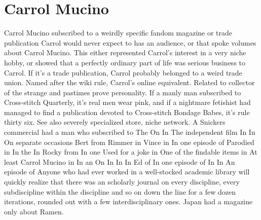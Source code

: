 \documentclass[12pt]{book}
\begin{document}
\chapter{Carrol Mucino}

Carrol Mucino subscribed to a weirdly specific fandom magazine or trade publication Carrol would never expect to has an audience, or that spoke volumes about Carrol Mucino. This either represented Carrol's interest in a very niche hobby, or showed that a perfectly ordinary part of life was serious business to Carrol. If it's a trade publication, Carrol probably belonged to a weird trade union. Named after the wiki rule, Carrol's online equivalent. Related to collector of the strange and pastimes prove personality. If a manly man subscribed to Cross-stitch Quarterly, it's real men wear pink, and if a nightmare fetishist had managed to find a publication devoted to Cross-stitch Bondage Babes, it's rule thirty six. See also severely specialized store, niche network. A Snickers commercial had a man who subscribed to The On In The independent film In In On separate occasions Bert from Rimmer in Vince in In one episode of Parodied in In the In Rocky from In one Used for a joke in One of the findable items in At least Carrol Mucino in In an On In In In Ed of In one episode of In In An episode of Anyone who had ever worked in a well-stocked academic library will quickly realize that there was an scholarly journal on every discipline, every subdiscipline within the discipline and so on down the line for a few dozen iterations, rounded out with a few interdisciplinary ones. Japan had a magazine only about Ramen.
\end{document}

